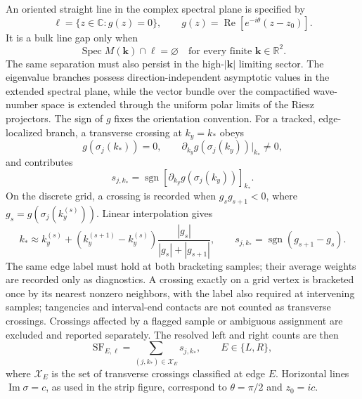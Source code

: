 \documentclass[11pt]{article}
\numberwithin{equation}{section}
\begin{document}
An oriented straight line in the complex spectral plane is specified by
\begin{equation}
  \ell=\{z\in\mathbb C:g(z)=0\},
  \qquad
  g(z)=\operatorname{Re}[e^{-i\theta}(z-z_0)].
  \label{eq:oriented_line_gap}
\end{equation}
It is a bulk line gap only when
\begin{equation}
  \operatorname{Spec}M(\mathbf k)\cap\ell=\varnothing
  \quad\text{for every finite }\mathbf k\in\mathbb R^2.
  \label{eq:bulk_line_gap_condition}
\end{equation}
The same separation must also persist in the high-$|\mathbf k|$ limiting
sector. The eigenvalue branches possess direction-independent asymptotic
values in the extended spectral plane, while the vector bundle over the
compactified wave-number space is extended through the uniform polar limits
of the Riesz projectors.
The sign of $g$ fixes the orientation convention.  For a tracked,
edge-localized branch, a transverse crossing at $k_y=k_*$ obeys
\begin{equation}
  g(\sigma_j(k_*))=0,
  \qquad
  \partial_{k_y}g(\sigma_j(k_y))|_{k_*}\neq0,
\end{equation}
and contributes
\begin{equation}
  s_{j,k_*}=\operatorname{sgn}
  \left[\partial_{k_y}g(\sigma_j(k_y))\right]_{k_*}.
  \label{eq:continuous_crossing_sign}
\end{equation}
On the discrete grid, a crossing is recorded when
$g_sg_{s+1}<0$, where $g_s=g(\sigma_j(k_y^{(s)}))$.  Linear interpolation
gives
\begin{equation}
  k_*\approx k_y^{(s)}+
  (k_y^{(s+1)}-k_y^{(s)})
  \frac{|g_s|}{|g_s|+|g_{s+1}|},
  \qquad
  s_{j,k_*}=\operatorname{sgn}(g_{s+1}-g_s).
  \label{eq:discrete_crossing_rule}
\end{equation}
The same edge label must hold at both bracketing samples; their average
weights are recorded only as diagnostics. A crossing exactly on a grid
vertex is bracketed once by its nearest nonzero neighbors, with the label
also required at intervening samples; tangencies and interval-end contacts
are not counted as transverse crossings. Crossings affected by a flagged
sample or ambiguous assignment are excluded and reported separately.
The resolved left and right counts are then
\begin{equation}
  \mathrm{SF}_{E,\ell}
  =\sum_{(j,k_*)\in\mathcal X_E}s_{j,k_*},
  \qquad E\in\{L,R\},
  \label{eq:discrete_edge_spectral_flow}
\end{equation}
where $\mathcal X_E$ is the set of transverse crossings classified at edge
$E$.  Horizontal lines $\operatorname{Im}\sigma=c$, as used in the strip
figure, correspond to $\theta=\pi/2$ and $z_0=ic$.
\end{document}
